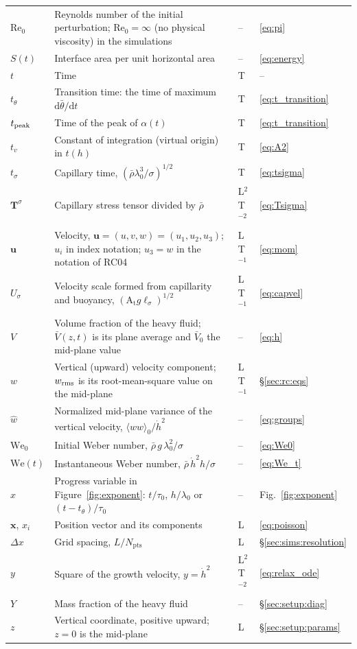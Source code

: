 \documentclass[11pt]{article}
\numberwithin{equation}{section}
\newcommand{\avg}[1]{\langle #1\rangle}
\newcommand{\At}{\mathrm{A_t}}
\newcommand{\We}{\mathrm{We}_0}
\newcommand{\ls}{\ell_\sigma}
\newcommand{\hd}{\dot h}
\begin{document}
\begin{longtable}{@{}P{0.13}P{0.53}P{0.13}P{0.13}@{}}
$\mathrm{Re}_0$ & Reynolds number of the initial perturbation; $\mathrm{Re}_0 = \infty$ (no physical viscosity) in the simulations & -- & \eqref{eq:pi}\\
$S(t)$ & Interface area per unit horizontal area & -- & \eqref{eq:energy}\\
$t$ & Time & T & --\\
$t_\theta$ & Transition time: the time of maximum $\mathrm d \bar\theta/\mathrm d t$ & T & \eqref{eq:t_transition}\\
$t_{\rm peak}$ & Time of the peak of $\alpha(t)$ & T & \eqref{eq:t_transition}\\
$t_v$ & Constant of integration (virtual origin) in $t(h)$ & T & \eqref{eq:A2}\\
$t_\sigma$ & Capillary time, $(\bar\rho \lambda_0^3/\sigma)^{1/2}$ & T & \eqref{eq:tsigma}\\
$\mathbf T^\sigma$ & Capillary stress tensor divided by $\bar\rho$ & L$^2$T$^{-2}$ & \eqref{eq:Tsigma}\\
$\mathbf u$ & Velocity, $\mathbf u = (u, v, w) = (u_1, u_2, u_3)$; $u_i$ in index notation; $u_3 = w$ in the notation of RC04 & L\,T$^{-1}$ & \eqref{eq:mom}\\
$U_\sigma$ & Velocity scale formed from capillarity and buoyancy, $(\At g \ls)^{1/2}$ & L\,T$^{-1}$ & \eqref{eq:capvel}\\
$V$ & Volume fraction of the heavy fluid; $\bar V(z, t)$ is its plane average and $\bar V_0$ the mid-plane value & -- & \eqref{eq:h}\\
$w$ & Vertical (upward) velocity component; $w_{\rm rms}$ is its root-mean-square value on the mid-plane & L\,T$^{-1}$ & \S\ref{sec:rc:eqs}\\
$\hat w$ & Normalized mid-plane variance of the vertical velocity, $\avg{w w}_0/\hd^2$ & -- & \eqref{eq:groups}\\
$\We$ & Initial Weber number, $\bar\rho \, g \, \lambda_0^2/\sigma$ & -- & \eqref{eq:We0}\\
$\mathrm{We}(t)$ & Instantaneous Weber number, $\bar\rho \, \hd^2 h/\sigma$ & -- & \eqref{eq:We_t}\\
$x$ & Progress variable in Figure~\ref{fig:exponent}: $t/\tau_0$, $h/\lambda_0$ or $(t - t_\theta)/\tau_0$ & -- & Fig.~\ref{fig:exponent}\\
$\mathbf x$, $x_i$ & Position vector and its components & L & \eqref{eq:poisson}\\
$\Delta x$ & Grid spacing, $L/N_\mathrm{pts}$ & L & \S\ref{sec:sims:resolution}\\
$y$ & Square of the growth velocity, $y = \hd^2$ & L$^2$T$^{-2}$ & \eqref{eq:relax_ode}\\
$Y$ & Mass fraction of the heavy fluid & -- & \S\ref{sec:setup:diag}\\
$z$ & Vertical coordinate, positive upward; $z = 0$ is the mid-plane & L & \S\ref{sec:setup:params}\\
\end{longtable}
\end{document}
